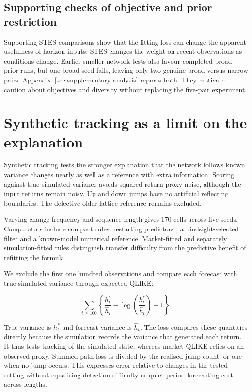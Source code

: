 \subsection{Supporting checks of objective and prior restriction}

Supporting STES comparisons show that the fitting loss can change the apparent usefulness of horizon inputs: STES changes the weight on recent observations as conditions change. Earlier smaller-network tests also favour completed broad-prior runs, but one broad seed fails, leaving only two genuine broad-versus-narrow pairs. Appendix~\ref{sec:supplementary-analysis} reports both. They motivate caution about objectives and diversity without replacing the five-pair experiment.

\section{Synthetic tracking as a limit on the explanation}

Synthetic tracking tests the stronger explanation that the network follows known variance changes nearly as well as a reference with extra information. Scoring against true simulated variance avoids squared-return proxy noise, although the input returns remain noisy. Up and down jumps have no artificial reflecting boundaries. The defective older lattice reference remains excluded.

Varying change frequency and sequence length gives 170 cells across five seeds. Comparators include compact rules, restarting predictors \citep{herbster1998tracking,hazan2009efficient}, a hindsight-selected filter and a known-model numerical reference. Market-fitted and separately simulation-fitted rules distinguish transfer difficulty from the predictive benefit of refitting the formula.

We exclude the first one hundred observations and compare each forecast with true simulated variance through expected QLIKE:

\begin{equation}
 \sum_{t\geq100}\left\{
 \frac{h_t^*}{\widehat h_t}-\log\!\left(\frac{h_t^*}{\widehat h_t}\right)-1\right\}.
 \label{eq:path-qlike-regret}
\end{equation}

True variance is $h_t^*$ and forecast variance is $\widehat h_t$. The loss compares these quantities directly because the simulation records the variance that generated each return. It thus tests tracking of the simulated state, whereas market QLIKE relies on an observed proxy. Summed path loss is divided by the realised jump count, or one when no jump occurs. This expresses error relative to changes in the tested setting without equalising detection difficulty or quiet-period forecasting cost across lengths.

